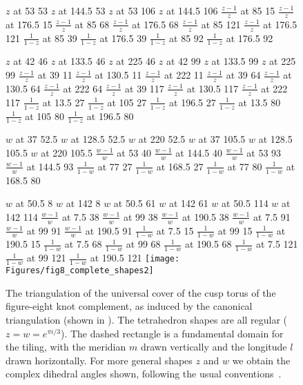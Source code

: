 \documentclass[12pt]{amsart}
\begin{document}
\begin{figure}[htbp]
\small\hair 2pt
\pinlabel $z$ at 53 53
\pinlabel $z$ at 144.5 53
\pinlabel $z$ at 53 106
\pinlabel $z$ at 144.5 106
\pinlabel $\frac{z-1}{z}$ at 85 15
\pinlabel $\frac{z-1}{z}$ at 176.5 15
\pinlabel $\frac{z-1}{z}$ at 85 68
\pinlabel $\frac{z-1}{z}$ at 176.5 68
\pinlabel $\frac{z-1}{z}$ at 85 121
\pinlabel $\frac{z-1}{z}$ at 176.5 121
\pinlabel $\frac{1}{1-z}$ at 85 39
\pinlabel $\frac{1}{1-z}$ at 176.5 39
\pinlabel $\frac{1}{1-z}$ at 85 92
\pinlabel $\frac{1}{1-z}$ at 176.5 92

\pinlabel $z$ at 42 46
\pinlabel $z$ at 133.5 46
\pinlabel $z$ at 225 46
\pinlabel $z$ at 42 99
\pinlabel $z$ at 133.5 99
\pinlabel $z$ at 225 99
\pinlabel $\frac{z-1}{z}$ at 39 11
\pinlabel $\frac{z-1}{z}$ at 130.5 11
\pinlabel $\frac{z-1}{z}$ at 222 11
\pinlabel $\frac{z-1}{z}$ at 39 64
\pinlabel $\frac{z-1}{z}$ at 130.5 64
\pinlabel $\frac{z-1}{z}$ at 222 64
\pinlabel $\frac{z-1}{z}$ at 39 117
\pinlabel $\frac{z-1}{z}$ at 130.5 117
\pinlabel $\frac{z-1}{z}$ at 222 117
\pinlabel $\frac{1}{1-z}$ at 13.5 27
\pinlabel $\frac{1}{1-z}$ at 105 27
\pinlabel $\frac{1}{1-z}$ at 196.5 27
\pinlabel $\frac{1}{1-z}$ at 13.5 80
\pinlabel $\frac{1}{1-z}$ at 105 80
\pinlabel $\frac{1}{1-z}$ at 196.5 80

\pinlabel $w$ at 37 52.5
\pinlabel $w$ at 128.5 52.5
\pinlabel $w$ at 220 52.5
\pinlabel $w$ at 37 105.5
\pinlabel $w$ at 128.5 105.5
\pinlabel $w$ at 220 105.5
\pinlabel $\frac{w-1}{w}$ at 53 40
\pinlabel $\frac{w-1}{w}$ at 144.5 40
\pinlabel $\frac{w-1}{w}$ at 53 93
\pinlabel $\frac{w-1}{w}$ at 144.5 93
\pinlabel $\frac{1}{1-w}$ at 77 27
\pinlabel $\frac{1}{1-w}$ at 168.5 27
\pinlabel $\frac{1}{1-w}$ at 77 80
\pinlabel $\frac{1}{1-w}$ at 168.5 80

\pinlabel $w$ at 50.5 8
\pinlabel $w$ at 142 8
\pinlabel $w$ at 50.5 61
\pinlabel $w$ at 142 61
\pinlabel $w$ at 50.5 114
\pinlabel $w$ at 142 114
\pinlabel $\frac{w-1}{w}$ at 7.5 38
\pinlabel $\frac{w-1}{w}$ at 99 38
\pinlabel $\frac{w-1}{w}$ at 190.5 38
\pinlabel $\frac{w-1}{w}$ at 7.5 91
\pinlabel $\frac{w-1}{w}$ at 99 91
\pinlabel $\frac{w-1}{w}$ at 190.5 91
\pinlabel $\frac{1}{1-w}$ at 7.5 15
\pinlabel $\frac{1}{1-w}$ at 99 15
\pinlabel $\frac{1}{1-w}$ at 190.5 15
\pinlabel $\frac{1}{1-w}$ at 7.5 68
\pinlabel $\frac{1}{1-w}$ at 99 68
\pinlabel $\frac{1}{1-w}$ at 190.5 68
\pinlabel $\frac{1}{1-w}$ at 7.5 121
\pinlabel $\frac{1}{1-w}$ at 99 121
\pinlabel $\frac{1}{1-w}$ at 190.5 121
\endlabellist
\texttt{[image: Figures/fig8\_complete\_shapes2]}
\caption{The triangulation of the universal cover of the cusp torus of the figure-eight knot complement, as induced by the canonical triangulation (shown in ).  The tetrahedron shapes are all regular ($z = w = e^{\pi i/3}$).  The dashed rectangle is a fundamental domain for the tiling, with the meridian $m$ drawn vertically and the longitude $l$ drawn horizontally.  For more general shapes $z$ and $w$ we obtain the complex dihedral angles shown, following the usual conventions~\cite[page~47]{thurston_notes}.}
\label{Fig:CuspTriangulationComplete}
\end{figure}
\end{document}
